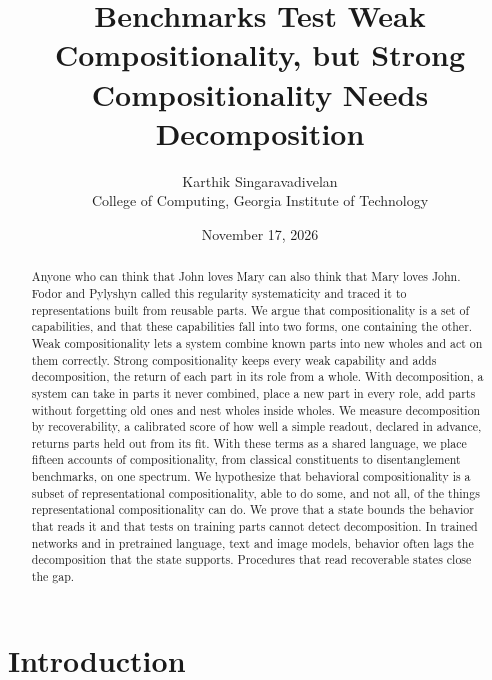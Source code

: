 \title{Benchmarks Test Weak Compositionality, but Strong Compositionality Needs Decomposition}
\author{Karthik Singaravadivelan\\ College of Computing, Georgia Institute of Technology}
\date{November 17, 2026}


\maketitle

\begin{abstract}
Anyone who can think that John loves Mary can also think that Mary loves John. Fodor and Pylyshyn called this regularity systematicity and traced it to representations built from reusable parts. We argue that compositionality is a set of capabilities, and that these capabilities fall into two forms, one containing the other. Weak compositionality lets a system combine known parts into new wholes and act on them correctly. Strong compositionality keeps every weak capability and adds decomposition, the return of each part in its role from a whole. With decomposition, a system can take in parts it never combined, place a new part in every role, add parts without forgetting old ones and nest wholes inside wholes. We measure decomposition by recoverability, a calibrated score of how well a simple readout, declared in advance, returns parts held out from its fit. With these terms as a shared language, we place fifteen accounts of compositionality, from classical constituents to disentanglement benchmarks, on one spectrum. We hypothesize that behavioral compositionality is a subset of representational compositionality, able to do some, and not all, of the things representational compositionality can do. We prove that a state bounds the behavior that reads it and that tests on training parts cannot detect decomposition. In trained networks and in pretrained language, text and image models, behavior often lags the decomposition that the state supports. Procedures that read recoverable states close the gap.
\end{abstract}

\section{Introduction}
\label{sec:intro}

